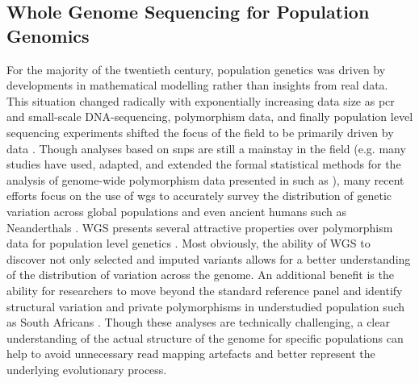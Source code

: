 \subsection{Whole Genome Sequencing for Population Genomics} \label{intro:popgen}

For the majority of the twentieth century, population genetics was driven by developments in mathematical modelling rather than insights from real data. This situation changed radically with exponentially increasing data size as \gls{pcr} and small-scale DNA-sequencing, polymorphism data, and finally population level sequencing experiments shifted the focus of the field to be primarily driven by data \cite{Kreitman1983,JE2010,Crawford2012}. Though analyses based on \glspl{snp} are still a mainstay in the field (e.g. many studies have used, adapted, and extended the formal statistical methods for the analysis of genome-wide polymorphism data presented in \textcite{Patterson2012a} such as \cite{Skoglund2017,Durand2011,Lipson2017,Skoglund2015,Pickrell2012,Wall2000,Nielsen2017a,Carto2009,Margaryan2020}), many recent efforts focus on the use of \gls{wgs} to accurately survey the distribution of genetic variation across global populations and even ancient humans such as Neanderthals \cite{Fan2019a,Mallick2016,Prufer2014,Bergstrom2019, Auton2015}. WGS presents several attractive properties over polymorphism data for population level genetics \cite{Hoglund2019}. Most obviously, the ability of WGS to discover not only selected and imputed variants allows for a better understanding of the distribution of variation across the genome. An additional benefit is the ability for researchers to move beyond the standard reference panel and identify structural variation and private polymorphisms in understudied population such as South Africans \cite{Choudhury2017a}. Though these analyses are technically challenging, a clear understanding of the actual structure of the genome for specific populations can help to avoid unnecessary read mapping artefacts and better represent the underlying evolutionary process. 

